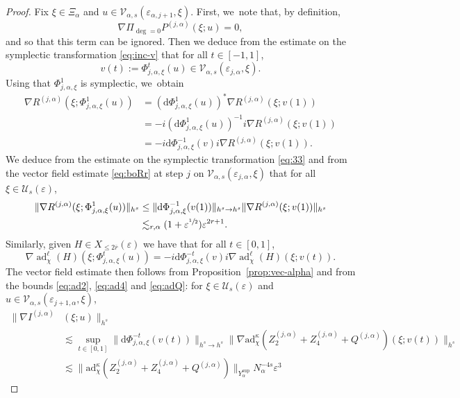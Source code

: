 \documentclass[10pt,a4paper]{amsart}
\theoremstyle{plain}
\theoremstyle{definition}
\newcommand{\1}{\mathbf{1}}
\newcommand{\Ysup}[1]{Y_{#1}^{\mathrm{sup}}}
\let\epsilon\varepsilon
\begin{document}
\begin{proof}
Fix $\xi\in\Xi_{\alpha}$ and $u\in\mathcal{V}_{\alpha,s}(\epsilon_{\alpha,j+1},\xi)$. First, we~note that, by definition,
\[
\nabla \Pi_{\deg=0}P^{(j,\alpha)}(\xi;u)=0,
\]
and so that this term can be ignored. Then we deduce from the estimate on the symplectic transformation \eqref{eq:inc-v} that for all $t\in[-1,1]$,
\[
v(t) := \Phi_{j,\alpha,\xi}^{t}(u)\in\mathcal{V}_{\alpha,s}(\epsilon_{j,\alpha},\xi).
\]
Using that $\Phi_{j,\alpha,\xi}^{1}$ is symplectic, we~obtain
\begin{align*}
\nabla R^{(j,\alpha)}(\xi;\Phi_{j,\alpha,\xi}^{1}(u))
&= (\mathrm{d}\Phi_{j,\alpha,\xi}^{1}(u))^{\ast}
\nabla R^{(j,\alpha)}(\xi;v(1)) \\
&= -i(\mathrm{d}\Phi_{j,\alpha,\xi}^{1}(u))^{-1}i
\nabla R^{(j,\alpha)}(\xi;v(1)) \\
&= -i\mathrm{d}\Phi_{j,\alpha,\xi}^{-1}(v)i
\nabla R^{(j,\alpha)}(\xi;v(1)).
\end{align*}
We deduce from the estimate on the symplectic transformation \eqref{eq:33} and from the vector field estimate \eqref{eq:boRr} at step $j$ on $\mathcal{V}_{\alpha,s}(\epsilon_{j,\alpha},\xi)$ that for all $\xi\in\mathcal{U}_{s}(\epsilon)$,
\[
\begin{split}
\|\nabla R^{(j,\alpha)}(\xi;
\Phi_{j,\alpha,\xi}^{1}(u))\|_{h^{s}}
&\leq
\|\mathrm{d}\Phi_{j,\alpha,\xi}^{-1}(v(1))\|_{h^{s}\to h^{s}}
\|\nabla R^{(j,\alpha)}(\xi;v(1))\|_{h^{s}} \\
&\lesssim_{r,\alpha} (1+\epsilon^{\sfrac{1}{2}})\epsilon^{2r+1}.
\end{split}
\]
Similarly, given $H\in X_{\leq2\overline{r}}(\epsilon)$ we have that for all $t\in[0,1]$,
\[
\nabla
\operatorname{ad}_{\chi}^{\ell}(H)(\xi;\Phi_{j,\alpha,\xi}^{t}(u))
= -i \mathrm{d}\Phi_{j,\alpha,\xi}^{-t}(v)i\nabla \operatorname{ad}_{\chi}^{\ell}(H)(\xi;v(t)).
\]
The vector field estimate then follows from Proposition~\ref{prop:vec-alpha} and from the bounds \eqref{eq:ad2}, \eqref{eq:ad4} and \eqref{eq:adQ}: for $\xi\in\mathcal{U}_{s}(\epsilon)$ and $u\in\mathcal{V}_{\alpha,s}(\epsilon_{j+1,\alpha},\xi)$,
\begin{align*}
\|\nabla I^{(j,\alpha)}&(\xi;u)\|_{h^{s}}\\
&\lesssim
\sup_{t\in[0,1]}\|\mathrm{d}\Phi_{j,\alpha,\xi}^{-t}(v(t))\|_{h^{s}\to h^{s}}
\|\nabla \mathrm{ad}_{\chi}^{\kappa}
(Z_{2}^{(j,\alpha)}
+Z_{4}^{(j,\alpha)}
+Q^{(j,\alpha)})
(\xi;v(t))\|_{h^{s}}
\\
&\lesssim
\| \mathrm{ad}_{\chi}^{\kappa}
(Z_{2}^{(j,\alpha)}+Z_{4}^{(j,\alpha)}+Q^{(j,\alpha)})
\|_{\Ysup{\alpha}}N_{\alpha}^{-4s}\epsilon^{3}

\end{align*}
\end{proof}
\end{document}
